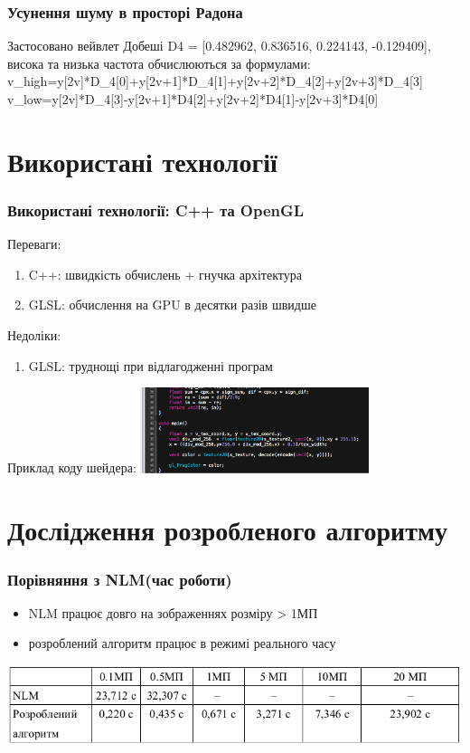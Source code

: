 \documentclass[12pt]{beamer}
\begin{document}
\begin{frame}\frametitle{Усунення шуму в просторі Радона}
	Застосовано вейвлет Добеші D4 = [0.482962, 0.836516, 0.224143, -0.129409], висока та низька частота обчислюються за формулами: \linebreak 
	v_{high}=y[2v]*D_{4}[0]+y[2v+1]*D_{4}[1]+y[2v+2]*D_{4}[2]+y[2v+3]*D_{4}[3] \linebreak \linebreak
	v_{low}=y[2v]*D_{4}[3]-y[2v+1]*D{4}[2]+y[2v+2]*D{4}[1]-y[2v+3]*D{4}[0] \linebreak
\end{frame}

\section{Використані технології}
\begin{frame}\frametitle{Використані технології: C++ та OpenGL}
	Переваги:
	\begin{enumerate}
		\item C++: швидкість обчислень  + гнучка архітектура
		\item GLSL: обчислення на GPU в десятки разів швидше  
	\end{enumerate}
	Недоліки:
	\begin{enumerate}
		\item GLSL: труднощі при відлагодженні програм
	\end{enumerate}
	
	Приклад коду шейдера:
	\includegraphics[height=2.5cm]{images/shader_snapshot}
\end{frame}

\section{Дослідження розробленого алгоритму}


\begin{frame}\frametitle{ Порівняння з NLM(час роботи)}
	\begin{itemize}
		\item NLM працює довго на зображеннях розміру > 1МП
		\item розроблений алгоритм працює в режимі реального часу
	\end{itemize}
	\includegraphics[scale=0.4]{images/table_imsize}
\end{frame}
\end{document}
